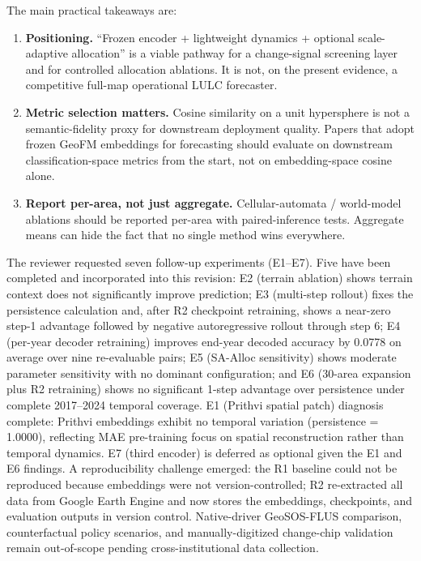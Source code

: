 \documentclass{article}
\begin{document}
The main practical takeaways are:

\begin{enumerate}
\item \textbf{Positioning.} ``Frozen encoder + lightweight dynamics + optional scale-adaptive allocation'' is a viable pathway for a change-signal screening layer and for controlled allocation ablations. It is not, on the present evidence, a competitive full-map operational LULC forecaster.
\item \textbf{Metric selection matters.} Cosine similarity on a unit hypersphere is not a semantic-fidelity proxy for downstream deployment quality. Papers that adopt frozen GeoFM embeddings for forecasting should evaluate on downstream classification-space metrics from the start, not on embedding-space cosine alone.
\item \textbf{Report per-area, not just aggregate.} Cellular-automata / world-model ablations should be reported per-area with paired-inference tests. Aggregate means can hide the fact that no single method wins everywhere.
\end{enumerate}

The reviewer requested seven follow-up experiments (E1--E7). Five have been completed and incorporated into this revision: E2 (terrain ablation) shows terrain context does not significantly improve prediction; E3 (multi-step rollout) fixes the persistence calculation and, after R2 checkpoint retraining, shows a near-zero step-1 advantage followed by negative autoregressive rollout through step 6; E4 (per-year decoder retraining) improves end-year decoded accuracy by 0.0778 on average over nine re-evaluable pairs; E5 (SA-Alloc sensitivity) shows moderate parameter sensitivity with no dominant configuration; and E6 (30-area expansion plus R2 retraining) shows no significant 1-step advantage over persistence under complete 2017--2024 temporal coverage. E1 (Prithvi spatial patch) diagnosis complete: Prithvi embeddings exhibit no temporal variation (persistence = 1.0000), reflecting MAE pre-training focus on spatial reconstruction rather than temporal dynamics. E7 (third encoder) is deferred as optional given the E1 and E6 findings. A reproducibility challenge emerged: the R1 baseline could not be reproduced because embeddings were not version-controlled; R2 re-extracted all data from Google Earth Engine and now stores the embeddings, checkpoints, and evaluation outputs in version control. Native-driver GeoSOS-FLUS comparison, counterfactual policy scenarios, and manually-digitized change-chip validation remain out-of-scope pending cross-institutional data collection.
\end{document}
